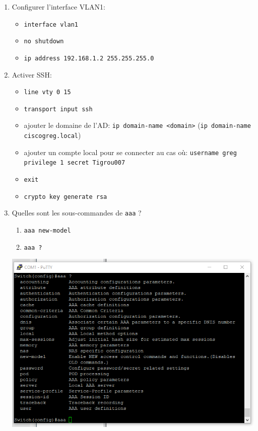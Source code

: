 \documentclass[a4paper]{article}
\begin{document}
\begin{enumerate}

\item Configurer l'interface VLAN1:
\begin{itemize}
    \item \texttt{interface vlan1}
    \item \texttt{no shutdown}
    \item \texttt{ip address 192.168.1.2 255.255.255.0}
\end{itemize}

\item Activer SSH:
\begin{itemize}
    \item \texttt{line vty 0 15}
    \item \texttt{transport input ssh}
    \item ajouter le domaine de l'AD: \texttt{ip domain-name <domain>} (\texttt{ip domain-name ciscogreg.local})
    \item ajouter un compte local pour se connecter au cas où: \texttt{username greg privilege 1 secret Tigrou007}
    \item \texttt{exit}
    \item \texttt{crypto key generate rsa}
\end{itemize}

\item Quelles sont les sous-commandes de \texttt{aaa} ?
\begin{enumerate}
    \item \texttt{aaa new-model}
    \item \texttt{aaa ?}
\end{enumerate}
\begin{center} \includegraphics[width=0.80\linewidth]{images/aaa-options.png} \end{center}


\end{enumerate}
\end{document}
